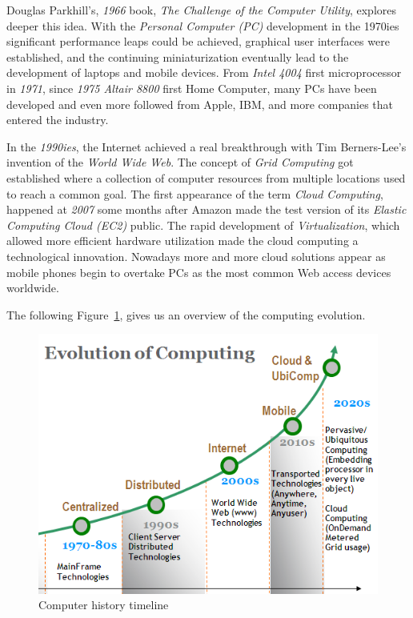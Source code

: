 Douglas Parkhill's, \emph{1966} book, \emph{The Challenge of the Computer
Utility}, explores deeper this idea. With the \emph{Personal Computer (PC)}
development in the 1970ies significant performance leaps could be achieved,
graphical user interfaces were established, and the continuing miniaturization
eventually lead to the development of laptops and mobile devices. From
\emph{Intel 4004} first microprocessor in \emph{1971}, since \emph{1975 Altair
8800} first Home Computer, many PCs have been developed and even more followed
from Apple, IBM, and more companies that entered the industry.

In the \emph{1990ies}, the Internet achieved a real breakthrough with Tim
Berners-Lee's invention of the \emph{World Wide Web}. The concept of \emph{Grid
Computing} got established where a collection of computer resources from
multiple locations used to reach a common goal. The first appearance of the
term \emph{Cloud Computing}, happened at \emph{2007} some months after Amazon
made the test version of its \emph{Elastic Computing Cloud (EC2)} public. The
rapid development of \emph{Virtualization}, which allowed more efficient
hardware utilization made the cloud computing a technological innovation.
Nowadays more and more cloud solutions appear as mobile phones begin to overtake
PCs as the most common Web access devices worldwide.

The following Figure~\ref{fig:comp_evol}, gives us an overview of the computing
evolution.

\begin{figure}[htbp]
  \begin{center}
    \includegraphics[width=0.75\maxwidth]{../figures/comp_evol.png}
    \caption{Computer history timeline\label{fig:comp_evol}}
   \end{center}
\end{figure}

